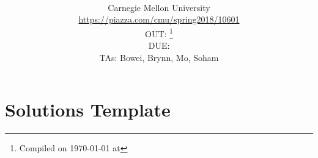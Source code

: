 \documentclass[11pt]{article}
\title{\textsc{\hwName}} %
\author{\courseName\\
  Carnegie Mellon University \\
\url{https://piazza.com/cmu/spring2018/10601} \\
OUT: \outDate{}\thanks{Compiled on \today{} at \currenttime{}} \\
DUE: \dueDate{} \\ 
TAs: Bowei, Brynn, Mo, Soham}
\date{}
\date{}
\numberwithin{equation}{section} %
\numberwithin{figure}{section} %
\numberwithin{table}{section} %
\begin{document}
\section*{Solutions Template}

\newpage
\end{document}
